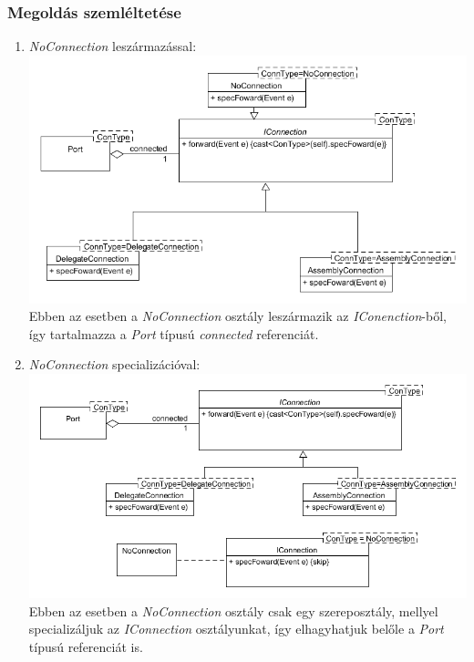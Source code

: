 \documentclass[a4paper,12pt]{report}
\begin{document}
\subsubsection{Megoldás szemléltetése}
\begin{enumerate}
\item \textit{NoConnection} leszármazással: \\
\includegraphics[scale=0.6]{extended_connection.png}
Ebben az esetben a \textit{NoConnection} osztály leszármazik az \textit{IConenction}-ből, így tartalmazza a \textit{Port} típusú \textit{connected} referenciát.
\item \textit{NoConnection} specializációval: \\
\includegraphics[scale=0.6]{extended_connection_spec.png}
Ebben az esetben a \textit{NoConnection} osztály csak egy szereposztály, mellyel specializáljuk az \textit{IConnection} osztályunkat, így elhagyhatjuk belőle a \textit{Port} típusú referenciát is.
\end{enumerate}
\end{document}
